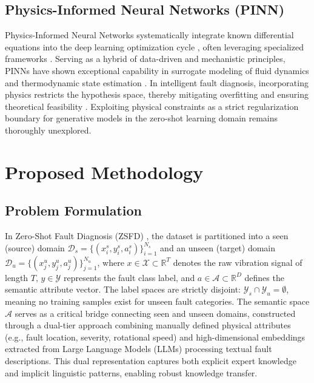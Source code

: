 \documentclass[journal]{IEEEtran}
\begin{document}
\subsection{Physics-Informed Neural Networks (PINN)}
Physics-Informed Neural Networks systematically integrate known differential equations into the deep learning optimization cycle \cite{raissi2019physics}, often leveraging specialized frameworks \cite{lu2021deepxde}. Serving as a hybrid of data-driven and mechanistic principles, PINNs have shown exceptional capability in surrogate modeling of fluid dynamics and thermodynamic state estimation \cite{chen2021physics}. In intelligent fault diagnosis, incorporating physics restricts the hypothesis space, thereby mitigating overfitting and ensuring theoretical feasibility \cite{yucesan2022hybrid}. Exploiting physical constraints as a strict regularization boundary for generative models in the zero-shot learning domain remains thoroughly unexplored.

\section{Proposed Methodology}
\label{sec:method}

\subsection{Problem Formulation}
In Zero-Shot Fault Diagnosis (ZSFD) \cite{zhang2023zero}, the dataset is partitioned into a seen (source) domain $\mathcal{D}_s = \{(x_i^s, y_i^s, a_i^s)\}_{i=1}^{N_s}$ and an unseen (target) domain $\mathcal{D}_u = \{(x_j^u, y_j^u, a_j^u)\}_{j=1}^{N_u}$, where $x \in \mathcal{X} \subset \mathbb{R}^T$ denotes the raw vibration signal of length $T$, $y \in \mathcal{Y}$ represents the fault class label, and $a \in \mathcal{A} \subset \mathbb{R}^D$ defines the semantic attribute vector. The label spaces are strictly disjoint: $\mathcal{Y}_s \cap \mathcal{Y}_u = \emptyset$, meaning no training samples exist for unseen fault categories. The semantic space $\mathcal{A}$ serves as a critical bridge connecting seen and unseen domains, constructed through a dual-tier approach combining manually defined physical attributes (e.g., fault location, severity, rotational speed) and high-dimensional embeddings extracted from Large Language Models (LLMs) processing textual fault descriptions. This dual representation captures both explicit expert knowledge and implicit linguistic patterns, enabling robust knowledge transfer.
\end{document}
